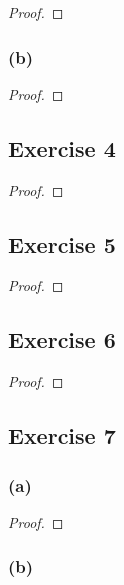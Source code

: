 \documentclass[14pt]{extarticle}
\begin{document}
\begin{proof}

\end{proof}

\subsubsection{(b)}

\begin{proof}

\end{proof}

\subsection{Exercise 4}

\begin{proof}

\end{proof}

\subsection{Exercise 5}

\begin{proof}

\end{proof}

\subsection{Exercise 6}

\begin{proof}

\end{proof}

\subsection{Exercise 7}

\subsubsection{(a)}

\begin{proof}

\end{proof}

\subsubsection{(b)}
\end{document}
